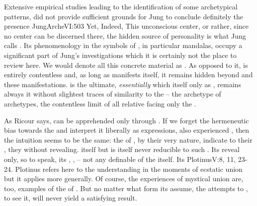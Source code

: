 \pa Extensive empirical studies leading to the identification of some
archetypical patterns, did not provide sufficient grounds for Jung to conclude
definitely the presence \citet{in the unconscious [of] an order equivalent to
  that of the ego.  It certainly does not look as if we were likely to discover
  an unconscious ego-personality.}{JungArche}{VI:503} Yet,
 Indeed,  This unconscious
center, or rather, since no center can be discerned there, the hidden source of
personality is what Jung calls .  Its phenomenology in the symbols of
, in particular mandalas, occupy a significant part of Jung's
investigations which it is certainly not the place to review here.  We would
denote all this concrete material as .  As opposed to it, 
is entirely contentless and, as long as  manifests itself, it
remains hidden beyond and  these manifestations.   is the
ultimate, {\em essentially}  which  itself only as
, remains always  it without slightest traces of
similarity to the  -- the archetype of archetypes, the
contentless limit of all relative  facing only the
 .

As Ricour says,  can be apprehended only through . If we
forget the hermeneutic bias towards the  and interpret it liberally as
 expressions, also experienced , then the intuition
seems to be the same: the  of , by their very nature,
indicate  to their , they  without
revealing.    itself
but is itself never reducible to such .  Its
 reveal only, so to speak, its , ,
 -- not any definable  of the  itself.
Its  \citet{is a kind of understanding and perception of our
  self, in which we must be very careful lest, wishing to perceive more, we do
  not stray away from our Self.}{Plotinus}{V:8, 11, 23-24.} Plotinus refers
here to the understanding in the moments of ecstatic union but it applies more
generally.  Of course, the experiences of mystical union are, too, examples of
the  of . But no matter what form its
 assume, the attempts to , to
 see it, will never yield a satisfying result.


